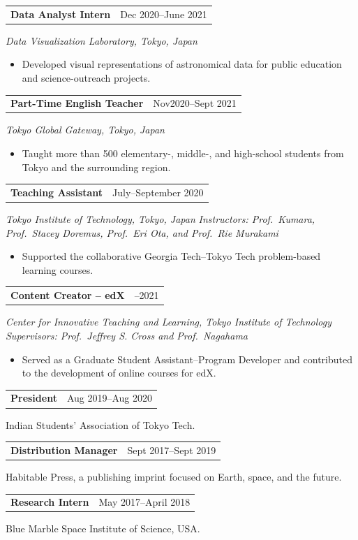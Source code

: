 \documentclass[10pt,a4paper]{article}
\makeatletter
\newcommand{\grantheading}[2]{%
\begin{tabularx}{\textwidth}{
    @{}
    >{\raggedright\arraybackslash}X
    >{\raggedleft\arraybackslash}p{4.5cm}
    @{}
}
\textbf{#1} & #2
\end{tabularx}
}
\newenvironment{lightitems}
{%
  \begin{itemize}[
      label=\textcolor{entrylight}{\textbullet},
      leftmargin=1.3em,
      itemsep=1pt,
      topsep=2pt,
      parsep=0pt
  ]
  \color{entrylight}
}
{%
  \end{itemize}
}
\makeatother
\begin{document}
\grantheading
{Data Analyst Intern}
{Dec 2020--June 2021}
\emph{Data Visualization Laboratory, Tokyo, Japan}
\begin{lightitems}
\item
\vspace{-1.5mm}Developed visual representations of astronomical data for public
education and science-outreach projects.
\end{lightitems}

\grantheading
{Part-Time English Teacher}
{Nov2020--Sept 2021}
\emph{Tokyo Global Gateway, Tokyo, Japan}
\begin{lightitems}
\item
\vspace{-1.5mm}Taught more than 500 elementary-, middle-, and high-school students
from Tokyo and the surrounding region.
\end{lightitems}

\grantheading
{Teaching Assistant}
{July--September 2020}
\emph{Tokyo Institute of Technology, Tokyo, Japan}
\emph{Instructors: Prof.\ Kumara, Prof.\ Stacey Doremus,
Prof.\ Eri Ota, and Prof.\ Rie Murakami}
\begin{lightitems}
\item
\vspace{-1.5mm}Supported the collaborative Georgia Tech--Tokyo Tech problem-based
learning courses.
\end{lightitems}

\grantheading
{Content Creator -- edX}
{2019--2021}
\emph{Center for Innovative Teaching and Learning,
Tokyo Institute of Technology}
\emph{Supervisors: Prof.\ Jeffrey S. Cross and Prof.\ Nagahama}
\begin{lightitems}
\item
\vspace{-1.5mm}Served as a Graduate Student Assistant--Program Developer and
contributed to the development of online courses for edX.
\end{lightitems}

\grantheading
{President}
{Aug 2019--Aug 2020}
{\color{entrylight}
Indian Students' Association of Tokyo Tech.
\par}

\grantheading
{Distribution Manager}
{Sept 2017--Sept 2019}
{\color{entrylight}
Habitable Press, a publishing imprint focused on Earth, space, and
the future.
\par}

\grantheading
{Research Intern}
{May 2017--April 2018}
{\color{entrylight}
Blue Marble Space Institute of Science, USA.
\par}
\end{document}
